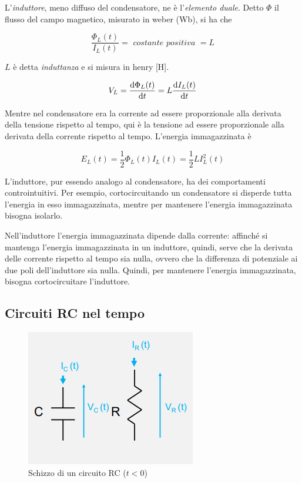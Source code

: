 \documentclass{article}
\begin{document}
L'\textit{induttore}, meno diffuso del condensatore, ne è l'\textit{elemento duale}. Detto $\Phi$ il flusso del campo magnetico, misurato in weber (Wb), si ha che 

\[\frac{\Phi _L (t)}{I_L (t)} = \textit{ costante positiva } = L \]

$L$ è detta \textit{induttanza} e si misura in henry [H]. 

\[V_L = \frac{\textrm d \Phi _L (t)}{\textrm d t} = L \frac{\textrm d I _L (t)}{\textrm d t}\]

Mentre nel condensatore era la corrente ad essere proporzionale alla derivata della tensione rispetto al tempo, qui è la tensione ad essere proporzionale alla derivata della corrente rispetto al tempo. L'energia immagazzinata è

\[E_L (t) = \frac{1}{2} \Phi _L (t) I_L (t) = \frac{1}{2} L I_L^2 (t)\]

L'induttore, pur essendo analogo al condensatore, ha dei comportamenti controintuitivi. Per esempio, cortocircuitando un condensatore si disperde tutta l'energia in esso immagazzinata, mentre per mantenere l'energia immagazzinata bisogna isolarlo. 

\vspace{3mm}

Nell'induttore l'energia immagazzinata dipende dalla corrente: affinché si mantenga l'energia immagazzinata in un induttore, quindi, serve che la derivata delle corrente rispetto al tempo sia nulla, ovvero che la differenza di potenziale ai due poli dell'induttore sia nulla. Quindi, per mantenere l'energia immagazzinata, bisogna cortocircuitare l'induttore.









\subsection{Circuiti RC nel tempo}

\begin{figure}[h]
  \centering
  \includegraphics[scale=0.7]{IM_circuito_RC}
  \caption{Schizzo di un circuito RC ($t<0$)}
  \label{Schema_circuito_RC}
\end{figure}
\end{document}
